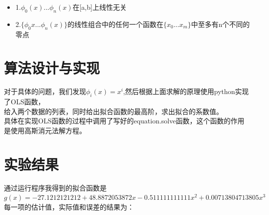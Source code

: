 \documentclass{article}
\begin{document}
\begin{itemize}
\item 1.$\phi_0(x)...\phi_n(x)$在[a,b]上线性无关
\item 2.$\{\phi_0{x}...\phi_n(x)\}$的线性组合中的任何一个函数在$\{x_0...x_m\}$中至多有n个不同的零点
\end{itemize}

\section{算法设计与实现}
对于具体的问题，我们发现$\phi_i(x) = x^i$,然后根据上面求解的原理使用python实现了OLS函数，\\给入两个数据的列表，同时给出拟合函数的最高阶，求出拟合的系数值。\\
具体在实现OLS函数的过程中调用了写好的equation.solve函数，这个函数的作用是使用高斯消元法解方程。\\
\section{实验结果}
通过运行程序我得到的拟合函数是\\$g(x) = -27.1212121212 +  48.8872053872x   -0.511111111111x^2    +    0.00713804713805x^3 $\\

每一项的估计值，实际值和误差的结果为：
\end{document}
